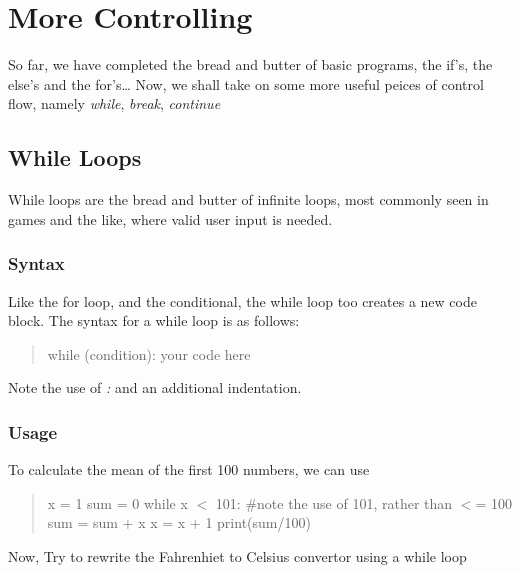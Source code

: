 \chapter{More Controlling}
So far, we have completed the bread and butter of basic programs, the if's, the else's and the for's…\newline
Now, we shall take on some more useful peices of control flow, namely \emph{while}, \emph{break}, \emph{continue}
\section{While Loops}
While loops are the bread and butter of infinite loops, most commonly seen in games and the like, where valid user input is needed.
\subsection{Syntax}
Like the for loop, and the conditional, the while loop too creates a new code block.
The syntax for a while loop is as follows:
\begin{quote}
while (condition): \newline
\tab \textlangle{}your code here\textrangle{}
\end{quote}
Note the use of \emph{:} and an additional indentation.

\subsection{Usage}
To calculate the mean of the first 100 numbers, we can use
\begin{quote}
x = 1 \newline
sum = 0 \newline
while x $<$ 101: $\#$note the use of 101, rather than $<$= 100 \newline
\tab sum = sum + x \newline
\tab x = x + 1 \newline
print(sum/100)
\end{quote}

Now, Try to rewrite the Fahrenhiet to Celsius convertor using a while loop
